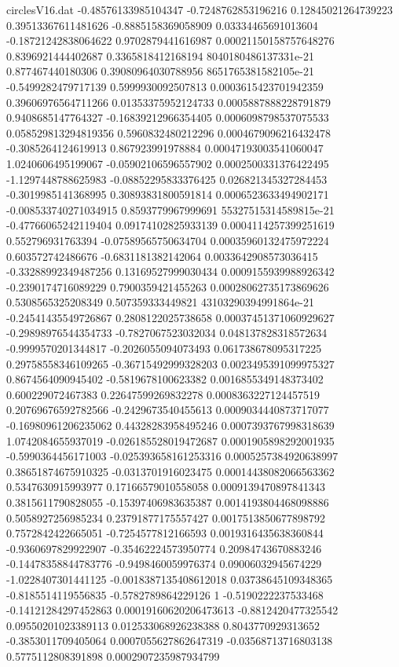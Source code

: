 \begin{filecontents}{circlesV16.dat}
-0.48576133985104347	-0.7248762853196216	0.12845021264739223
0.39513367611481626	-0.8885158369058909	0.03334465691013604
-0.18721242838064622	0.9702879441616987	0.00021150158757648276
0.8396921444402687	0.3365818412168194	8040180486137331e-21
0.877467440180306	0.39080964030788956	8651765381582105e-21
-0.5499282479717139	0.5999930092507813	0.0003615423701942359
0.39606976564711266	0.01353375952124733	0.0005887888228791879
0.9408685147764327	-0.16839212966354405	0.0006098798537075533
0.058529813294819356	0.5960832480212296	0.0004679096216432478
-0.3085264124619913	0.867923991978884	0.00047193003541060047
1.0240606495199067	-0.05902106596557902	0.0002500331376422495
-1.1297448788625983	-0.08852295833376425	0.026821345327284453
-0.3019985141368995	0.30893831800591814	0.0006523633494902171
-0.008533740271034915	0.8593779967999691	55327515314589815e-21
-0.47766065242119404	0.09174102825933139	0.0004114257399251619
0.552796931763394	-0.07589565750634704	0.00035960132475972224
0.603572742486676	-0.6831181382142064	0.0033642908573036415
-0.33288992349487256	0.13169527999030434	0.0009155939988926342
-0.2390174716089229	0.7900359421455263	0.00028062735173869626
0.5308565325208349	0.507359333449821	43103290394991864e-21
-0.24541435549726867	0.2808122025738658	0.00037451371060929627
-0.29898976544354733	-0.7827067523032034	0.048137828318572634
-0.9999570201344817	-0.2026055094073493	0.061738678095317225
0.29758558346109265	-0.36715492999328203	0.0023495391099975327
0.8674564090945402	-0.5819678100623382	0.0016855349148373402
0.600229072467383	0.22647599269832278	0.0008363227124457519
0.20769676592782566	-0.2429673540455613	0.0009034440873717077
-0.16980961206235062	0.44328283958495246	0.0007393767998318639
1.0742084655937019	-0.026185528019472687	0.0001905898292001935
-0.5990364456171003	-0.025393658161253316	0.0005257384920638997
0.38651874675910325	-0.0313701916023475	0.00014438082066563362
0.5347630915993977	0.17166579010558058	0.0009139470897841343
0.3815611790828055	-0.15397406983635387	0.0014193804468098886
0.5058927256985234	0.23791877175557427	0.0017513850677898792
0.7572842422665051	-0.7254577812166593	0.0019316435638360844
-0.9360697829922907	-0.35462224573950774	0.20984743670883246
-0.14478358844783776	-0.9498460059976374	0.09006032945674229
-1.0228407301441125	-0.0018387135408612018	0.03738645109348365
-0.8185514119556835	-0.5782789864229126	1
-0.5190222237533468	-0.14121284297452863	0.00019160620206473613
-0.8812420477325542	0.09550201023389113	0.012533068926238388
0.8043770929313652	-0.3853011709405064	0.0007055627862647319
-0.03568713716803138	0.5775112808391898	0.0002907235987934799

\end{filecontents}
